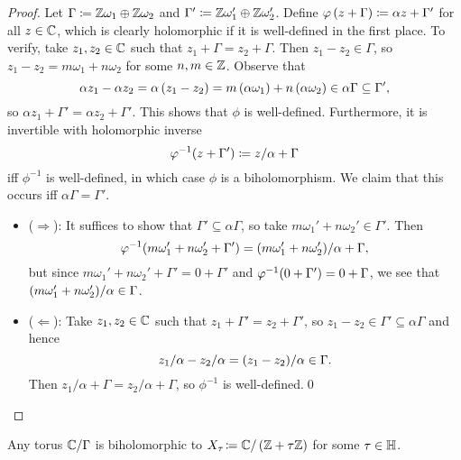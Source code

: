 \documentclass[../Moduli_Spaces_of_Riemann_Surfaces.tex]{subfiles}
\begin{document}
    \begin{proof}
        Let $\Gamma\coloneqq\mathbb{Z}\omega_1\oplus\mathbb{Z}\omega_2$ and $\Gamma'\coloneqq\mathbb{Z}\omega_1'\oplus\mathbb{Z}\omega_2'$. Define $\varphi\left(z+\Gamma\right)\coloneqq\alpha z+\Gamma'$ for all $z\in\mathbb{C}$, which is clearly holomorphic if it is well-defined in the first place. To verify, take $z_1,z_2\in\mathbb{C}$ such that $z_1+\Gamma=z_2+\Gamma$. Then $z_1-z_2\in\Gamma$, so $z_1-z_2=m\omega_1+n\omega_2$ for some $n,m\in\mathbb{Z}$. Observe that
        \begin{equation*}
            \alpha z_1-\alpha z_2=\alpha\left(z_1-z_2\right)=m\left(\alpha\omega_1\right)+n\left(\alpha\omega_2\right)\in\alpha\Gamma\subseteq\Gamma',
        \end{equation*}
        so $\alpha z_1+\Gamma'=\alpha z_2+\Gamma'$. This shows that $\phi$ is well-defined. Furthermore, it is invertible with holomorphic inverse
        \begin{equation*}
            \varphi^{-1}\!\left(z+\Gamma'\right)\coloneqq z/\alpha+\Gamma
        \end{equation*}
        iff $\phi^{-1}$ is well-defined, in which case $\phi$ is a biholomorphism. We claim that this occurs iff $\alpha\Gamma=\Gamma'$.
        \begin{itemize}
            \item ($\Rightarrow$): It suffices to show that $\Gamma'\subseteq\alpha\Gamma$, so take $m\omega_1'+n\omega_2'\in\Gamma'$. Then
                \begin{equation*}
                    \varphi^{-1}\!\left(m\omega_1'+n\omega_2'+\Gamma'\right)=\left(m\omega_1'+n\omega_2'\right)\!/\alpha+\Gamma,
                \end{equation*}
                but since $m\omega_1'+n\omega_2'+\Gamma'=0+\Gamma'$ and $\varphi^{-1}\!\left(0+\Gamma'\right)=0+\Gamma$, we see that $\left(m\omega_1'+n\omega_2'\right)\!/\alpha\in\Gamma$.
            \item ($\Leftarrow$): Take $z_1,z_2\in\mathbb{C}$ such that $z_1+\Gamma'=z_2+\Gamma'$, so $z_1-z_2\in\Gamma'\subseteq\alpha\Gamma$ and hence
                \begin{equation*}
                    z_1/\alpha-z_2/\alpha=\left(z_1-z_2\right)\!/\alpha\in\Gamma.
                \end{equation*}
                Then $z_1/\alpha+\Gamma=z_2/\alpha+\Gamma$, so $\phi^{-1}$ is well-defined.\qed
        \end{itemize}
    \end{proof}
    \begin{lemma}
        Any torus $\mathbb{C}/\Gamma$ is biholomorphic to $X_\tau\!\coloneqq\mathbb{C}/\left(\mathbb{Z}+\tau\mathbb{Z}\right)$ for some $\tau\in\mathbb{H}$.
    \end{lemma}\vspace{-0.08in}
\end{document}
